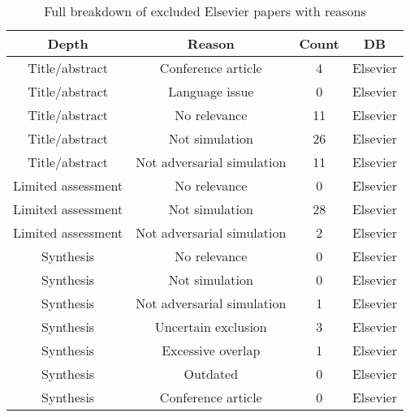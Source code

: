\documentclass{article}
\begin{document}
\begin{center}
\begin{table}[h!]
\begin{tabular}{ | c | c | c | c |}
\hline
Depth & Reason & Count & DB \\
\hline
Title/abstract & Conference article & 4 & Elsevier \\
\hline
Title/abstract & Language issue & 0 & Elsevier \\
\hline
Title/abstract & No relevance & 11 & Elsevier \\
\hline
Title/abstract & Not simulation & 26 & Elsevier \\
\hline
Title/abstract & Not adversarial simulation & 11 & Elsevier \\
\hline
Limited assessment & No relevance & 0 & Elsevier \\
\hline
Limited assessment & Not simulation & 28 & Elsevier \\
\hline
Limited assessment & Not adversarial simulation & 2 & Elsevier \\
\hline
Synthesis & No relevance & 0 & Elsevier \\
\hline
Synthesis & Not simulation & 0 & Elsevier \\
\hline
Synthesis & Not adversarial simulation & 1 & Elsevier \\
\hline
Synthesis & Uncertain exclusion & 3 & Elsevier \\
\hline
Synthesis & Excessive overlap & 1 & Elsevier \\
\hline
Synthesis & Outdated & 0 & Elsevier \\
\hline
Synthesis & Conference article & 0 & Elsevier \\
\hline
\end{tabular}
\caption{\label{table:RelevanceBreakdownElsevier} Full breakdown of excluded Elsevier papers with reasons}
\end{table}
\end{center}
\end{document}
